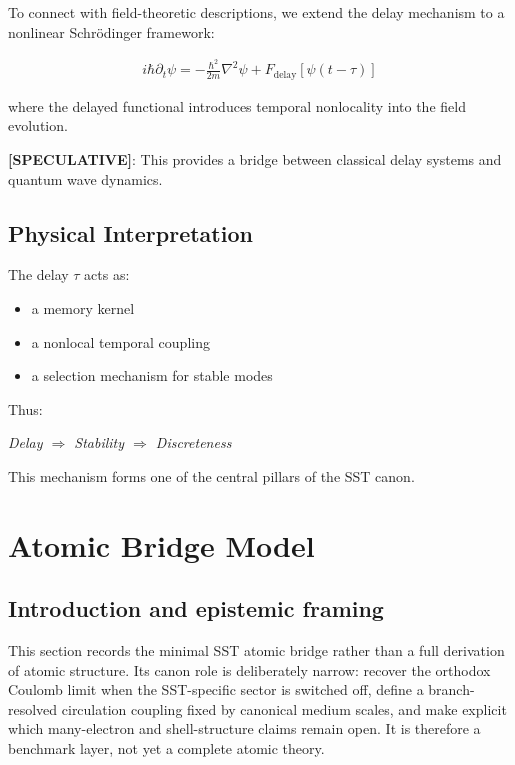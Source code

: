 \documentclass[11pt]{article}
\theoremstyle{definition}
\theoremstyle{plain}
\theoremstyle{remark}
\begin{document}
        To connect with field-theoretic descriptions, we extend the delay mechanism to a nonlinear Schrödinger framework:
        
        \begin{align}
            i \hbar \partial_t \psi = -\frac{\hbar^2}{2m} \nabla^2 \psi + F_{\text{delay}}[\psi(t - \tau)]
        \end{align}
        
        where the delayed functional introduces temporal nonlocality into the field evolution.
        
        \textbf{[SPECULATIVE]}: This provides a bridge between classical delay systems and quantum wave dynamics.
    
    \subsection{Physical Interpretation}
        
        The delay $\tau$ acts as:
        
        \begin{itemize}
            \item a memory kernel
            \item a nonlocal temporal coupling
            \item a selection mechanism for stable modes
        \end{itemize}
        
        Thus:
        
        \begin{center}
            \textit{Delay $\Rightarrow$ Stability $\Rightarrow$ Discreteness}
        \end{center}
        
        This mechanism forms one of the central pillars of the SST canon.

        
\section{Atomic Bridge Model}
    \label{sec:atomic}

    \subsection{Introduction and epistemic framing}
        This section records the minimal SST atomic bridge rather than a full derivation of atomic structure. Its canon role is deliberately narrow: recover the orthodox Coulomb limit when the SST-specific sector is switched off, define a branch-resolved circulation coupling fixed by canonical medium scales, and make explicit which many-electron and shell-structure claims remain open. It is therefore a benchmark layer, not yet a complete atomic theory.
    
\end{document}
